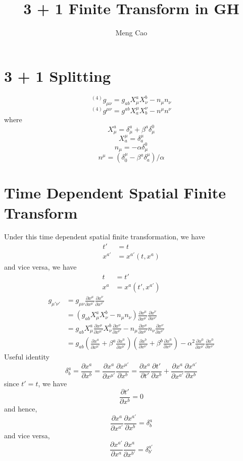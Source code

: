 \documentclass{article}
\begin{document}
\title{3 + 1 Finite Transform in GH}
\author{Meng Cao}
\maketitle
\section{3 + 1 Splitting}
\[
^{(4)}g_{\mu\nu} = g_{ab}X^{a}_{\mu}X^{b}_{\nu} - n_{\mu}n_{\nu}
\]
\[
^{(4)}g^{\mu\nu} = g^{ab}X^{\mu}_{a}X^{\nu}_{b} - n^{\mu}n^{\nu}
\]
where
\[
X^{a}_{\mu} = \delta^{a}_{\mu} + \beta^{a}\delta^{0}_{\mu} 
\]
\[
X^{\mu}_{a} = \delta^{\mu}_{a}
\]
\[
n_{\mu} = -\alpha \delta^{0}_{\mu}
\]
\[
n^{\mu} = (\delta^{\mu}_{0} - \beta^{a}\delta_{a}^{\mu})/\alpha
\]
\section{Time Dependent Spatial Finite Transform}
Under this time dependent spatial finite transformation, we have
\begin{align*}
t' & = t\\
x^{a'} & = x^{a'}(t,x^{a})
\end{align*}
and vice versa, we have
\begin{align*}
t & = t'\\
x^{a} & = x^{a}(t',x^{a'})
\end{align*}
\begin{align*}
g_{\mu'\nu'} & = g_{\mu\nu}\frac{\partial x^{\mu}}{\partial x^{\mu'}}\frac{\partial x^{\nu}}{\partial x^{\nu'}}\\
& = (g_{ab}X^{a}_{\mu}X^{b}_{\nu} - n_{\mu}n_{\nu})\frac{\partial x^{\mu}}{\partial x^{\mu'}}\frac{\partial x^{\nu}}{\partial x^{\nu'}}\\
& = g_{ab}X^{a}_{\mu}\frac{\partial x^{\mu}}{\partial x^{\mu'}}X^{b}_{\nu}\frac{\partial x^{\nu}}{\partial x^{\nu'}} - n_{\mu}\frac{\partial x^{\mu}}{\partial x^{\mu'}}n_{\nu}\frac{\partial x^{\nu}}{\partial x^{\nu'}}\\
& = g_{ab}(\frac{\partial x^{a}}{\partial x^{\mu '}} + \beta^{a}\frac{\partial x^{0}}{\partial x^{\mu '}})(\frac{\partial x^{b}}{\partial x^{\nu '}} + \beta^{b}\frac{\partial x^{0}}{\partial x^{\nu '}}) - \alpha^2\frac{\partial x^{0}}{\partial x^{\mu '}}\frac{\partial x^{0}}{\partial x^{\nu '}}
\end{align*}
Useful identity
\[
\delta^{a}_{b} = \frac{\partial x^{a}}{\partial x^{b}} = \frac{\partial x^{a}}{\partial x^{\mu'}}\frac{\partial x^{\mu'}}{\partial x^{b}} = \frac{\partial x^{a}}{\partial t'}\frac{\partial t'}{\partial x^{b}} + \frac{\partial x^{a}}{\partial x^{a'}}\frac{\partial x^{a'}}{\partial x^{b}}
\]
since $t' = t$, we have
\[
\frac{\partial t'}{\partial x^{b}} = 0
\]
and hence,
\[
\boxed{
\frac{\partial x^{a}}{\partial x^{a'}}\frac{\partial x^{a'}}{\partial x^{b}} = \delta^{a}_{b}
}
\]
and vice versa, 
\[
\boxed{
\frac{\partial x^{a'}}{\partial x^{a}}\frac{\partial x^{a}}{\partial x^{b'}} = \delta^{a'}_{b'}
}
\]
\end{document}
